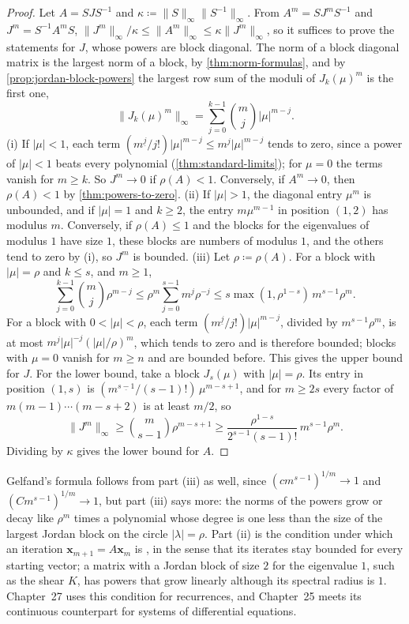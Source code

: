 \begin{proof}
Let $A=SJS^{-1}$ and $\kappa\coloneqq\|S\|_\infty\|S^{-1}\|_\infty$. From $A^m=SJ^mS^{-1}$ and $J^m=S^{-1}A^mS$, $\|J^m\|_\infty/\kappa\le\|A^m\|_\infty\le\kappa\|J^m\|_\infty$, so it suffices to prove the statements for $J$, whose powers are block diagonal. The norm of a block diagonal matrix is the largest norm of a block, by \cref{thm:norm-formulas}, and by \cref{prop:jordan-block-powers} the largest row sum of the moduli of $J_k(\mu)^m$ is the first one,
\[
\|J_k(\mu)^m\|_\infty=\sum_{j=0}^{k-1}\binom mj|\mu|^{m-j}.
\]
(i) If $|\mu|<1$, each term $(m^{\underline j}/j!)|\mu|^{m-j}\le m^j|\mu|^{m-j}$ tends to zero, since a power of $|\mu|<1$ beats every polynomial (\cref{thm:standard-limits}); for $\mu=0$ the terms vanish for $m\ge k$. So $J^m\to0$ if $\rho(A)<1$. Conversely, if $A^m\to0$, then $\rho(A)<1$ by \cref{thm:powers-to-zero}. (ii) If $|\mu|>1$, the diagonal entry $\mu^m$ is unbounded, and if $|\mu|=1$ and $k\ge2$, the entry $m\mu^{m-1}$ in position $(1,2)$ has modulus $m$. Conversely, if $\rho(A)\le1$ and the blocks for the eigenvalues of modulus $1$ have size $1$, these blocks are numbers of modulus $1$, and the others tend to zero by (i), so $J^m$ is bounded. (iii) Let $\rho\coloneqq\rho(A)$. For a block with $|\mu|=\rho$ and $k\le s$, and $m\ge1$,
\[
\sum_{j=0}^{k-1}\binom mj\rho^{m-j}\le\rho^m\sum_{j=0}^{s-1}m^j\rho^{-j}\le s\max(1,\rho^{1-s})\,m^{s-1}\rho^m .
\]
For a block with $0<|\mu|<\rho$, each term $(m^{\underline j}/j!)|\mu|^{m-j}$, divided by $m^{s-1}\rho^m$, is at most $m^{j}|\mu|^{-j}(|\mu|/\rho)^m$, which tends to zero and is therefore bounded; blocks with $\mu=0$ vanish for $m\ge n$ and are bounded before. This gives the upper bound for $J$. For the lower bound, take a block $J_s(\mu)$ with $|\mu|=\rho$. Its entry in position $(1,s)$ is $(m^{\underline{s-1}}/(s-1)!)\,\mu^{m-s+1}$, and for $m\ge2s$ every factor of $m(m-1)\cdots(m-s+2)$ is at least $m/2$, so
\[
\|J^m\|_\infty\ge\binom m{s-1}\rho^{m-s+1}\ge\frac{\rho^{1-s}}{2^{s-1}(s-1)!}\,m^{s-1}\rho^m .
\]
Dividing by $\kappa$ gives the lower bound for $A$.
\end{proof}

Gelfand's formula follows from part (iii) as well, since $(cm^{s-1})^{1/m}\to1$ and $(Cm^{s-1})^{1/m}\to1$, but part (iii) says more: the norms of the powers grow or decay like $\rho^m$ times a polynomial whose degree is one less than the size of the largest Jordan block on the circle $|\lambda|=\rho$. Part (ii) is the condition under which an iteration $\mathbf x_{m+1}=A\mathbf x_m$ is , in the sense that its iterates stay bounded for every starting vector; a matrix with a Jordan block of size $2$ for the eigenvalue $1$, such as the shear $K$, has powers that grow linearly although its spectral radius is $1$. Chapter~27 uses this condition for recurrences, and Chapter~25 meets its continuous counterpart for systems of differential equations.

